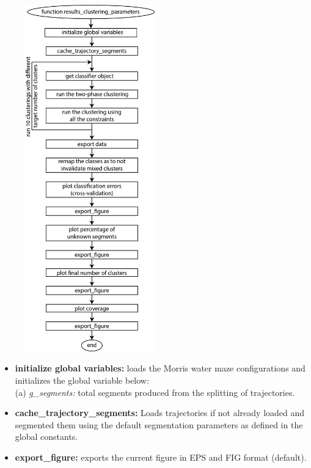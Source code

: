 \documentclass[12pt,titlepage]{article}
\begin{document}
\begin{doublespace}
\begin{figure}[H]
	\begin{center}
		\includegraphics[width=0.5\textwidth]{results_clustering_parameters.jpg}
		\label{sfig2}
	\end{center}
\end{figure}

\begin{itemize}
	\item\textbf{initialize global variables:} loads the Morris water maze configurations and initializes the global variable below:\\
	(a) \textit{g\_segments:} total segments produced from the splitting of trajectories.
	\item\textbf{cache\_trajectory\_segments:} Loads trajectories if not already loaded and segmented them using the default segmentation parameters as defined in the global constants.
	\item\textbf{export\_figure:} exports the current figure in EPS and FIG format (default).
\end{itemize}


\end{doublespace}
\end{document}
